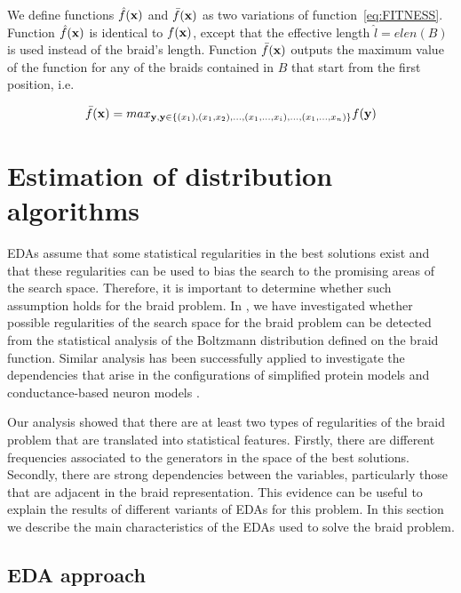  We define functions $\hat{f}({\bf{x}})$ and  $\bar{f}({\bf{x}})$ as two variations of function~\eqref{eq:FITNESS}. Function  $\hat{f}({\bf{x}})$ is identical to $f({\bf{x}})$, except that the effective length $\hat{l}=elen(B)$ is used instead of the braid's length. Function $\bar{f}({\bf{x}})$ outputs the maximum value of the function for any of the braids contained in $B$ that start from the first position, i.e. 

\begin{equation}
     \bar{f}({\bf{x}}) =  max_{{\bf{y}}, {\bf{y}} \in \{(x_1),(x_1,x_2),\dots,(x_1, \dots,x_i), \dots, (x_1,\dots,x_n)\}} f({\bf{y}})
\end{equation}


\section{Estimation of distribution algorithms} \label{sec:EDAs}


 EDAs assume that some  statistical regularities in the best solutions exist and that these regularities can be used to bias the search to the promising areas of the search space. Therefore, it is important to determine whether such assumption holds for the braid problem.  In \cite{Santana_et_al::2014a}, we have investigated whether possible regularities of the search space for the braid problem can be detected from the statistical analysis of the Boltzmann distribution \cite{Muehlenbein_and_Mahnig:2002a} defined on the braid function.  Similar analysis has been successfully applied to investigate the dependencies that arise in the configurations of simplified protein models \cite{Santana_et_al:2008a} and conductance-based neuron models \cite{Santana_et_al:2012h}.

 
 Our analysis showed that there are at least two types of regularities of the braid problem that are translated into statistical features. Firstly, there are different frequencies associated to the generators in the space of the best solutions. Secondly, there are strong dependencies between the variables, particularly those that are adjacent in the braid representation. This evidence can be useful to explain the results of different variants of EDAs for this problem. In this section we describe the main characteristics of the EDAs used to solve the braid problem. 


\subsection{EDA approach}



